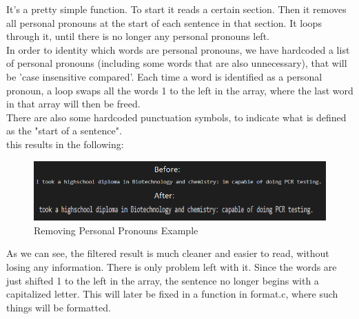 It's a pretty simple function. To start it reads a certain section. Then it removes all personal pronouns at the start of each sentence in that section.
It loops through it, until there is no longer any personal pronouns left.
\\
In order to identity which words are personal pronouns, we have hardcoded a list of personal pronouns\cite{english_personal_pronouns} (including some words that are also unnecessary), that will be 'case insensitive compared'.
Each time a word is identified as a personal pronoun, a loop swaps all the words 1 to the left in the array, where the last word in that array will then be freed.
\\
There are also some hardcoded punctuation symbols, to indicate what is defined as the "start of a sentence". 
\\
this results in the following:
\begin{figure}[H]
  \centering
  \includegraphics[scale = 0.6]{figures/personal_pronoun_ex.png}
  \caption{Removing Personal Pronouns Example}
\end{figure}

As we can see, the filtered result is much cleaner and easier to read, without losing any information.
There is only problem left with it. Since the words are just shifted 1 to the left in the array, the sentence no longer begins
with a capitalized letter. This will later be fixed in a function in format.c, where such things will be formatted.


